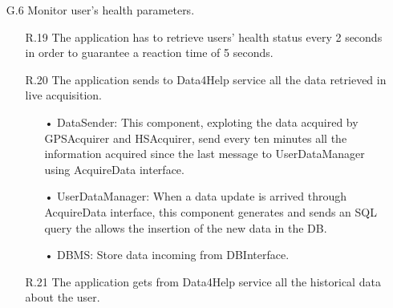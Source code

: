 \begin{enumerate}
\item [G.6] Monitor user's health parameters.
	\begin{enumerate}
	\item [R.19] The application has to retrieve users' health status every 2 seconds in order to guarantee a reaction time of 5 seconds.
	\item [R.20] The application sends to Data4Help service all the data retrieved in live acquisition.
		\begin{enumerate}
		\item[•] DataSender: This component, exploting the data acquired by GPSAcquirer and HSAcquirer, send every ten minutes all the information acquired since the last message to UserDataManager using AcquireData interface.
		\item[•] UserDataManager: When a data update is arrived through AcquireData interface, this component generates and sends an SQL query the allows the insertion of the new data in the DB.
		\item[•] DBMS: Store data incoming from DBInterface.
		\end{enumerate}	
	\item [R.21] The application gets from Data4Help service all the historical data about the user.
	
	\end{enumerate}

	
\end{enumerate}